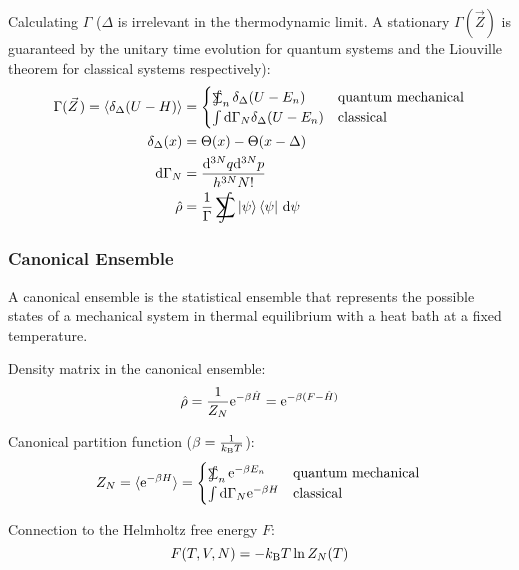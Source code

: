 			\noindent
			Calculating $\Gamma$ ($\Delta$ is irrelevant in the thermodynamic limit. A stationary $\Gamma(\vec{Z})$ is guaranteed by the unitary time evolution for quantum systems and the Liouville theorem for classical systems respectively):
			\begin{equation}
				\begin{aligned}
					\Gamma(\vec{Z}) = \langle \delta_\Delta (U-H) \rangle
						&= \begin{cases}
								\SumInt_n \delta_\Delta(U-E_n) & \text{quantum mechanical} \\
								\int \dd \Gamma_N \delta_\Delta(U-E_n) & \text{classical}
							\end{cases} \\
					\delta_\Delta(x) &= \Theta(x) - \Theta(x-\Delta)\\
					\dd \Gamma_N &= \frac{\dd^{3N}q \dd^{3N}p }{h^{3N} N!} \\
					\hat{\rho} &= \frac{1}{\Gamma} \SumInt \Ket{\psi}\Bra{\psi}\,\dd\psi
				\end{aligned}
			\end{equation}
			
			\subsubsection{Canonical Ensemble}
			A canonical ensemble is the statistical ensemble that represents the possible states of a mechanical system in thermal equilibrium with a heat bath at a fixed temperature.

			Density matrix in the canonical ensemble:
			\begin{equation}
				\hat{\rho} = \frac{1}{Z_N} \mathrm{e}^{-\beta \hat{H}} = \mathrm{e}^{-\beta (F-\hat{H})}
			\end{equation}

			\noindent
			Canonical partition function ($\beta = \frac{1}{k_{\text{B}} T}$):
			\begin{equation}
				Z_N=\langle \ex^{-\beta H} \rangle
					= \begin{cases}
							\SumInt_n \ex^{-\beta E_n} & \text{quantum mechanical} \\
							\int \dd \Gamma_N \ex^{-\beta H} & \text{classical}
						\end{cases} \\
			\end{equation}

			\noindent
			Connection to the Helmholtz free energy $F$:
			\begin{equation}
				F(T, V, N) = -k_{\text{B}} T \ln{Z_N(T)}
			\end{equation}


